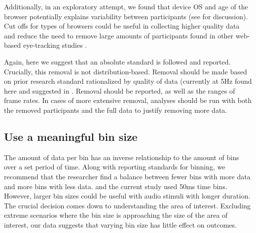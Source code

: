 Additionally, in an exploratory attempt, we found that device OS and age of the browser potentially explains variability between participants (see \parencite{Rodd_2024-in_press} for discussion). Cut offs for types of browsers could be useful in collecting higher quality data and reduce the need to remove large amounts of participants found in other web-based eye-tracking studies \parencite{Prystauka_Altmann_Rothman_2023}.

Again, here we suggest that an absolute standard is followed and reported. Crucially, this removal is not distribution-based. Removal should be made based on prior research standard rationalized by quality of data  (currently at 5Hz found here and suggested in \textcite{Vos_2017}. Removal should be reported, as well as the ranges of frame rates. In cases of more extensive removal, analyses should be run with both the removed participants and the full data to justify removing more data.

\subsection{Use a meaningful bin size}
The amount of data per bin has an inverse relationship to the amount of bins over a set period of time. Along with reporting standards for binning, we recommend that the researcher find a balance between fewer bins with more data and more bins with less data. \textcite{Vos_2017} and the current study used 50ms time bins. However, larger bin sizes could be useful with audio stimuli with longer duration. The crucial decision comes down to understanding the area of interest. Excluding extreme scenarios where the bin size is approaching the size of the area of interest, our data suggests that varying bin size has little effect on outcomes. 



